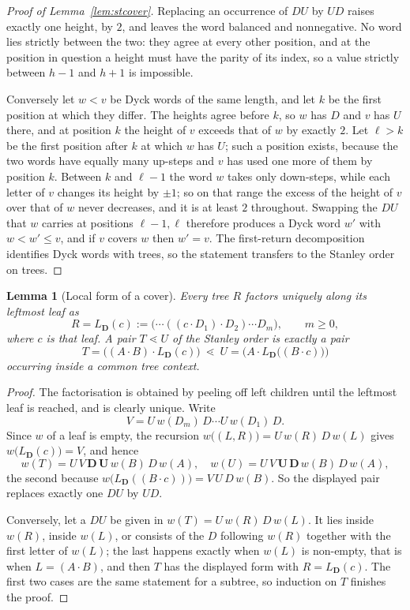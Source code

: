 \documentclass[11pt,a4paper]{article}
\theoremstyle{plain}
\newtheorem{lemma}[theorem]{Lemma}
\theoremstyle{definition}
\begin{document}
\begin{proof}[Proof of Lemma~\ref{lem:stcover}]
Replacing an occurrence of $DU$ by $UD$ raises exactly one height, by $2$, and leaves
the word balanced and nonnegative. No word lies strictly between the two: they agree at
every other position, and at the position in question a height must have the parity of
its index, so a value strictly between $h-1$ and $h+1$ is impossible.

Conversely let $w<v$ be Dyck words of the same length, and let $k$ be the first position
at which they differ. The heights agree before $k$, so $w$ has $D$ and $v$ has $U$
there, and at position $k$ the height of $v$ exceeds that of $w$ by exactly $2$. Let
$\ell>k$ be the first position after $k$ at which $w$ has $U$; such a position exists,
because the two words have equally many up-steps and $v$ has used one more of them by
position $k$. Between $k$ and $\ell-1$ the word $w$ takes only down-steps, while each
letter of $v$ changes its height by $\pm1$; so on that range the excess of the height of
$v$ over that of $w$ never decreases, and it is at least $2$ throughout. Swapping the
$DU$ that
$w$ carries at positions $\ell-1,\ell$ therefore produces a Dyck word $w'$ with
$w<w'\le v$, and if $v$ covers $w$ then $w'=v$. The first-return decomposition
identifies Dyck words with trees, so the statement transfers to the Stanley order on
trees.
\end{proof}

\begin{lemma}[Local form of a cover]\label{lem:localcover}
Every tree $R$ factors uniquely along its leftmost leaf as
\[
  R=L_{\mathbf D}(c):=\bigl(\cdots((c\cdot D_1)\cdot D_2)\cdots D_m\bigr),
  \qquad m\ge0,
\]
where $c$ is that leaf. A pair $T\lessdot U$ of the Stanley order is exactly a pair
\[
  T=\bigl((A\cdot B)\cdot L_{\mathbf D}(c)\bigr)
  \ \lessdot\
  U=\bigl(A\cdot L_{\mathbf D}\bigl((B\cdot c)\bigr)\bigr)
\]
occurring inside a common tree context.
\end{lemma}

\begin{proof}
The factorisation is obtained by peeling off left children until the leftmost leaf is
reached, and is clearly unique. Write
\[
  V=U\,w(D_m)\,D\cdots U\,w(D_1)\,D .
\]
Since $w$ of a leaf is empty, the recursion $w\bigl((L,R)\bigr)=U\,w(R)\,D\,w(L)$
gives $w\bigl(L_{\mathbf D}(c)\bigr)=V$, and hence
\[
  w(T)=U\,V\,\mathbf{D}\,\mathbf{U}\,w(B)\,D\,w(A),
  \quad
  w(U)=U\,V\,\mathbf{U}\,\mathbf{D}\,w(B)\,D\,w(A),
\]
the second because $w\bigl(L_{\mathbf D}((B\cdot c))\bigr)=V\,U\,D\,w(B)$. So the
displayed pair replaces exactly one $DU$ by $UD$.

Conversely, let a $DU$ be given in $w(T)=U\,w(R)\,D\,w(L)$. It lies inside $w(R)$,
inside $w(L)$, or consists of the $D$ following $w(R)$ together with the first letter of
$w(L)$; the last happens exactly when $w(L)$ is non-empty, that is when $L=(A\cdot B)$,
and then $T$ has the displayed form with $R=L_{\mathbf D}(c)$. The first two cases are
the same statement for a subtree, so induction on $T$ finishes the proof.
\end{proof}
\end{document}
